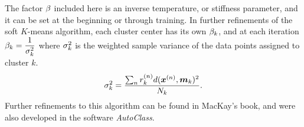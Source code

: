 The factor \(\beta\) included here is an inverse temperature, or stiffness 
parameter, and it can be set at the beginning or through training.  In further 
refinements of the soft $K$-means algorithm, each cluster center has its own
\(\beta_k\), and at each iteration \(\beta_k = \dfrac{1}{\sigma_k^2}\) where 
\(\sigma_k^{2}\) is the weighted sample variance of the data points assigned to 
cluster $k$.
\begin{equation}\label{isoSigma}
\sigma_k^{2} = \frac{\sum_n r_k^{(n)}d(\bm x^{(n)},\bm m_k)^2}{N_k}.
\end{equation}
Further refinements to this algorithm can be found in MacKay's book, and were 
also developed in the software \textit{AutoClass}. \cite{MacKay2002,AutoClass1,AutoClass2}
